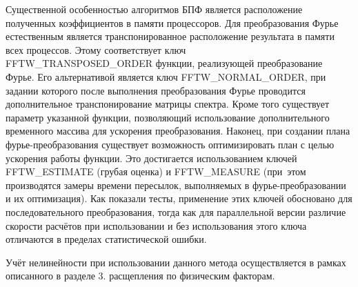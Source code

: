Существенной особенностью алгоритмов БПФ является расположение полученных коэффициентов в памяти процессоров.
Для преобразования Фурье естественным является транспонированное расположение результата в памяти всех процессов.
Этому соответствует ключ \\ FFTW\_TRANSPOSED\_ORDER функции, реализующей преобразование Фурье.
Его альтернативой является ключ FFTW\_NORMAL\_ORDER, при задании которого после выполнения преобразования Фурье
проводится дополнительное транспонирование матрицы спектра.
Кроме того существует параметр указанной функции, позволяющий использование дополнительного временного массива для ускорения преобразования.
Наконец, при создании плана фурье-преобразования существует возможность оптимизировать план с целью ускорения работы функции.
Это достигается использованием ключей FFTW\_ESTIMATE (грубая оценка) и FFTW\_MEASURE (при~этом производятся замеры времени пересылок, выполняемых в фурье-преобразовании и их оптимизация).
Как показали тесты, применение этих ключей обосновано для последовательного преобразования,
тогда как для параллельной версии различие скорости расчётов при использовании и без использования этого ключа отличаются в пределах статистической ошибки.

Учёт нелинейности при использовании данного метода осуществляется в рамках описанного в разделе 3. расщепления по физическим факторам.
